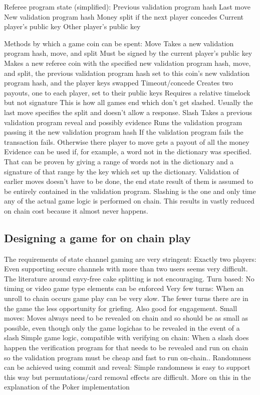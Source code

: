 \documentclass[a4paper]{article}
\begin{document}
\begin{multicols}{2}
Referee program state (simplified):
Previous validation program hash
Last move
New validation program hash
Money split if the next player concedes
Current player’s public key
Other player’s public key

Methods by which a game coin can be spent:
Move
Takes a new validation program hash, move, and split
Must be signed by the current player’s public key
Makes a new referee coin with the specified new validation program hash, move, and split, the previous validation program hash set to this coin’s new validation program hash, and the player keys swapped
Timeout/concede
Creates two payouts, one to each player, set to their public keys
Requires a relative timelock but not signature
This is how all games end which don’t get slashed. Usually the last move specifies the split and doesn’t allow a response.
Slash
Takes a previous validation program reveal and possibly evidence
Runs the validation program passing it the new validation program hash
If the validation program fails the transaction fails. Otherwise there player to move gets a payout of all the money
Evidence can be used if, for example, a word not in the dictionary was specified. That can be proven by giving a range of words not in the dictionary and a signature of that range by the key which set up the dictionary.
Validation of earlier moves doesn’t have to be done, the end state result of them is assumed to be entirely contained in the validation program. Slashing is the one and only time any of the actual game logic is performed on chain. This results in vastly reduced on chain cost because it almost never happens.


\subsection{Designing a game for on chain play}

The requirements of state channel gaming are very stringent:
Exactly two players: Even supporting secure channels with more than two users seems very difficult. The literature around envy-free cake splitting is not encouraging.
Turn based: No timing or video game type elements can be enforced
Very few turns: When an unroll to chain occurs game play can be very slow. The fewer turns there are in the game the less opportunity for griefing. Also good for engagement.
Small moves: Moves always need to be revealed on chain and so should be as small as possible, even though only the game logichas to be revealed in the event of a slash
Simple game logic, compatible with verifying on chain: When a slash does happen the verification program for that needs to be revealed and run on chain so the validation program must be cheap and fast to run on-chain..
Randomness can be achieved using commit and reveal: Simple randomness is easy to support this way but permutations/card removal effects are difficult. More on this in the explanation of the Poker implementation


\end{multicols}
\end{document}
